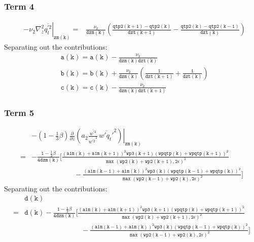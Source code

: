 \documentclass[11pt,fleqn]{article}
\newcommand{\ptlder}[2]{\frac{\partial #1}{\partial #2}}
\begin{document}
\subsubsection{Term 4}

\begin{equation}
\begin{split}
& \left. - \nu_2 \nabla_z^2 \overline{q_t^{'2}} \right|_{\mathtt{zm(k)}}
=& \mathtt{
    \frac{\nu_2}{dzm(k)}
    \left( \frac{qtp2(k+1)-qtp2(k)}{dzt(k+1)}
          -\frac{qtp2(k)-qtp2(k-1)}{dzt(k)}
    \right)
   }
\end{split}
\end{equation}
%
Separating out the contributions:
%
\begin{equation}
\begin{split}
&\mathtt{a(k) = a(k) - \frac{\nu_2}{dzm(k)dzt(k)} } \\
&\mathtt{b(k) = b(k) + \frac{\nu_2}{dzm(k)}
                       \left( \frac{1}{dzt(k+1)} + \frac{1}{dzt(k)} \right) } \\
&\mathtt{c(k) = c(k) - \frac{\nu_2}{dzm(k)dzt(k+1)} }
\end{split}
\end{equation}

\subsubsection{Term 5}

\begin{equation}
\begin{split}
& - \left. \left( 1 - \frac{1}{3}\beta \right)
       \ptlder{}{z}
         \left( 
           a_2
           \frac{\overline{w^{'3}}}{\overline{w^{'2}}^2} \,
           \overline{w'q_t'}^2
         \right) \right|_{\mathtt{zm(k)}} \\
=& \mathtt{
   - \frac{1 - \frac{1}{3}\beta}{4 dzm(k)}
     \bigg[ \frac{\left(a1m(k)+a1m(k+1)\right)^2 wp3(k+1) \left(wpqtp(k)+wpqtp(k+1)\right)^2}
                 {\max\left(wp2(k)+wp2(k+1),2\epsilon\right)^2} } \\
 & \mathtt{ \quad \quad \quad \quad \quad \quad
           -\frac{\left(a1m(k-1)+a1m(k)\right)^2 wp3(k) \left(wpqtp(k-1)+wpqtp(k)\right)^2}
                 {\max\left(wp2(k-1)+wp2(k),2\epsilon\right)^2}
     \bigg]
   }
\end{split}
\end{equation}
%
Separating out the contributions:
%
\begin{equation}
\begin{split}
&\mathtt{d(k)} \\
=& \mathtt{
   d(k)
   - \frac{1 - \frac{1}{3}\beta}{4 dzm(k)}
     \bigg[ \frac{\left(a1m(k)+a1m(k+1)\right)^2 wp3(k+1) \left(wpqtp(k)+wpqtp(k+1)\right)^2}
                 {\max\left(wp2(k)+wp2(k+1),2\epsilon\right)^2} } \\
 & \mathtt{ \quad \quad \quad \quad \quad \quad \quad \quad
           -\frac{\left(a1m(k-1)+a1m(k)\right)^2 wp3(k) \left(wpqtp(k-1)+wpqtp(k)\right)^2}
                 {\max\left(wp2(k-1)+wp2(k),2\epsilon\right)^2}
     \bigg]
   }
\end{split}
\end{equation}
\end{document}
